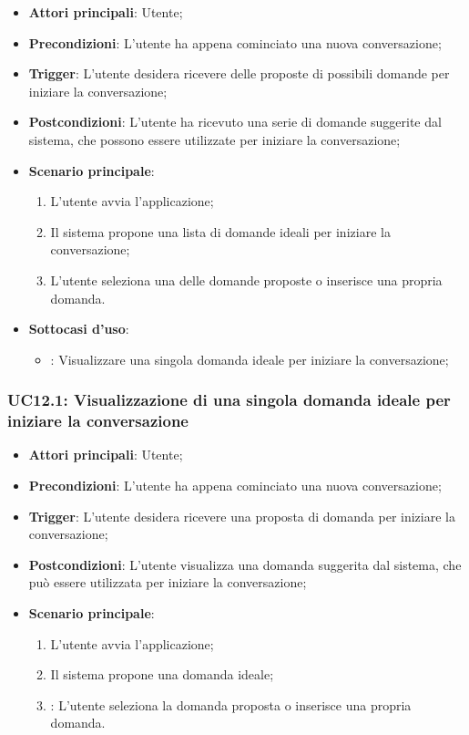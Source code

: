 \begin{itemize}
    \item \textbf{Attori principali}: Utente;
    \item \textbf{Precondizioni}: L'utente ha appena cominciato una nuova conversazione;
    \item \textbf{Trigger}: L'utente desidera ricevere delle proposte di possibili domande per iniziare la conversazione;
    \item \textbf{Postcondizioni}: L'utente ha ricevuto una serie di domande suggerite dal sistema, che possono essere utilizzate per iniziare la conversazione;
    \item \textbf{Scenario principale}:
    \begin{enumerate}
        \item L'utente avvia l'applicazione;
        \item Il sistema propone una lista di domande ideali per iniziare la conversazione;
        \item L'utente seleziona una delle domande proposte o inserisce una propria domanda.
    \end{enumerate}
    \item \textbf{Sottocasi d'uso}:
    \begin{itemize}
        \item {}: Visualizzare una singola domanda ideale per iniziare la conversazione;
    \end{itemize}
\end{itemize}

\hypertarget{UC12.1}{}
\subsubsection{UC12.1: Visualizzazione di una singola domanda ideale per iniziare la conversazione}
\begin{itemize}
    \item \textbf{Attori principali}: Utente;
    \item \textbf{Precondizioni}: L'utente ha appena cominciato una nuova conversazione;
    \item \textbf{Trigger}: L'utente desidera ricevere una proposta di domanda per iniziare la conversazione;
    \item \textbf{Postcondizioni}: L'utente visualizza una domanda suggerita dal sistema, che può essere utilizzata per iniziare la conversazione;
    \item \textbf{Scenario principale}:
    \begin{enumerate}
        \item L'utente avvia l'applicazione;
        \item Il sistema propone una domanda ideale;
        \item {}: L'utente seleziona la domanda proposta o inserisce una propria domanda.
    \end{enumerate}
\end{itemize}


